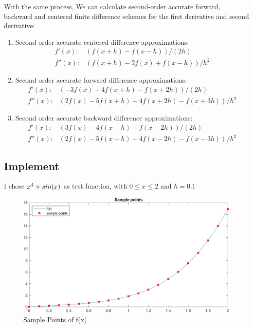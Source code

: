 \documentclass[
	12pt, %
]{fphw}
\numberwithin{equation}{section}
\numberwithin{figure}{section}
\numberwithin{table}{section}
\begin{document}
With the same process, We can calculate second-order accurate forward, backward and centered finite difference
schemes for the first derivative and second derivative:
\begin{enumerate}
	\item Second order accurate centered difference approximations:
	      \begin{equation}
		      \begin{aligned}
			      f' (x):  & (f (x+h)-f (x-h)) /(2 h)        \\
			      f'' (x): & (f (x+h)-2 f (x)+f (x-h)) / h^2
		      \end{aligned}
	      \end{equation}
	\item Second order accurate forward difference approximations:
	      \begin{equation}
		      \begin{aligned}
			      f' (x):  & (-3 f (x)+4 f (x+h)-f (x+2 h)) / (2 h)          \\
			      f'' (x): & (2 f (x)-5 f (x+h)+4 f (x+2 h)-f (x+3 h)) / h^2
		      \end{aligned}
	      \end{equation}
	\item Second order accurate backward difference approximations:
	      \begin{equation}
		      \begin{aligned}
			      f' (x):  & (3 f (x)-4 f (x-h)+f (x-2 h)) / (2 h)           \\
			      f'' (x): & (2 f (x)-5 f (x-h)+4 f (x-2 h)-f (x-3 h)) / h^2
		      \end{aligned}
	      \end{equation}
\end{enumerate}

\subsection*{Implement}

I chose $x^4+\\sin(x)$ as test function, with $0\leq x \leq 2$ and $h=0.1$

\begin{figure}[h!]
	\centering
	\includegraphics[width=0.8\columnwidth]{img/sample_points.png} %
	\caption{Sample Points of f(x)}
	\label{fig:sample_points}
\end{figure}
\end{document}
